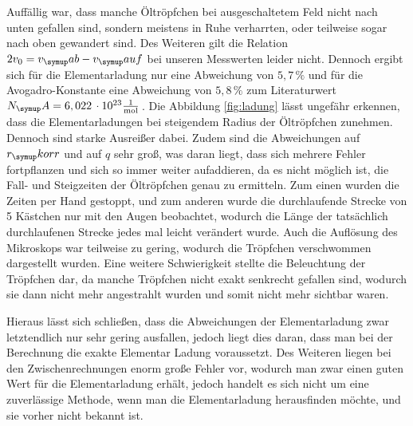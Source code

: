 Auffällig war, dass manche Öltröpfchen bei ausgeschaltetem Feld nicht
nach unten gefallen sind, sondern meistens in Ruhe verharrten, oder
teilweise sogar nach oben gewandert sind. Des Weiteren gilt
die Relation $2v_0 = v_\su{ab}-v_\su{auf}$ bei unseren Messwerten
leider nicht. Dennoch ergibt sich für die Elementarladung nur eine
Abweichung von $5,7\,\%$ und für die Avogadro-Konstante eine
Abweichung von $5,8\,\%$ zum Literaturwert $N_\su{A} = 6,022 \,\cdot 10^{23}\si[per-mode=fraction]{\per\mol}$\,\cite{Na}.
Die Abbildung \ref{fig:ladung} lässt ungefähr erkennen, dass die Elementarladungen
bei steigendem Radius der Öltröpfchen zunehmen. Dennoch sind starke Ausreißer dabei. 
Zudem sind die Abweichungen auf $r_\su{korr}$ und auf $q$ sehr
groß, was daran liegt, dass sich mehrere Fehler fortpflanzen und sich
so immer weiter aufaddieren, da es nicht möglich ist, die Fall- und
Steigzeiten der Öltröpfchen genau zu ermitteln. Zum einen wurden die
Zeiten per Hand gestoppt, und zum anderen wurde die durchlaufende Strecke
von 5 Kästchen nur mit den Augen beobachtet, wodurch die Länge der tatsächlich
durchlaufenen Strecke jedes mal leicht verändert wurde. Auch
die Auflösung des Mikroskops war teilweise zu gering, wodurch die Tröpfchen
verschwommen dargestellt wurden. Eine weitere Schwierigkeit stellte die
Beleuchtung der Tröpfchen dar, da manche Tröpfchen nicht exakt senkrecht gefallen
sind, wodurch sie dann nicht mehr angestrahlt wurden und somit nicht mehr sichtbar waren.

Hieraus lässt sich schließen, dass die Abweichungen der Elementarladung zwar
letztendlich nur sehr gering ausfallen, jedoch liegt dies daran, dass man bei der Berechnung
die exakte Elementar Ladung voraussetzt. Des Weiteren liegen bei den Zwischenrechnungen
enorm große Fehler vor, wodurch man zwar einen guten Wert für die Elementarladung erhält,
jedoch handelt es sich nicht um eine zuverlässige Methode, wenn man die Elementarladung herausfinden möchte, und sie vorher nicht bekannt ist.

